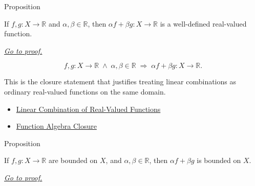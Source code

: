 \begin{propositionbox}{Proposition}
\begin{proposition}
\label{prop:linear-combination-closure}
If \(f,g:X\to\mathbb{R}\) and \(\alpha,\beta\in\mathbb{R}\), then
\(\alpha f+\beta g:X\to\mathbb{R}\) is a well-defined real-valued
function.

\smallskip\noindent
\hyperref[prf:linear-combination-closure]{\textit{Go to proof.}}
\end{proposition}
\end{propositionbox}

\begin{remark*}
\[
  f,g:X\to\mathbb{R}\;\wedge\;\alpha,\beta\in\mathbb{R}
  \;\Longrightarrow\;
  \alpha f+\beta g:X\to\mathbb{R}.
\]
\end{remark*}

\begin{remark*}[Interpretation]
This is the closure statement that justifies treating linear combinations as
ordinary real-valued functions on the same domain.
\end{remark*}

\begin{dependencies}
\begin{itemize}
  \item \hyperref[def:linear-combination-of-real-valued-functions]{Linear Combination of Real-Valued Functions}
  \item \hyperref[thm:function-algebra-closure]{Function Algebra Closure}
\end{itemize}
\end{dependencies}

\begin{propositionbox}{Proposition}
\begin{proposition}
\label{prop:bounded-linear-combination}
If \(f,g:X\to\mathbb{R}\) are bounded on \(X\), and
\(\alpha,\beta\in\mathbb{R}\), then \(\alpha f+\beta g\) is bounded on
\(X\).

\smallskip\noindent
\hyperref[prf:bounded-linear-combination]{\textit{Go to proof.}}
\end{proposition}
\end{propositionbox}

